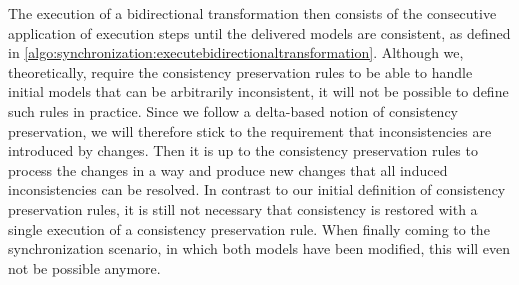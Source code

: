 The execution of a bidirectional transformation then consists of the consecutive application of execution steps until the delivered models are consistent, as defined in \autoref{algo:synchronization:executebidirectionaltransformation}.
Although we, theoretically, require the consistency preservation rules to be able to handle initial models that can be arbitrarily inconsistent, it will not be possible to define such rules in practice.
Since we follow a delta-based notion of consistency preservation, we will therefore stick to the requirement that inconsistencies are introduced by changes.
Then it is up to the consistency preservation rules to process the changes in a way and produce new changes that all induced inconsistencies can be resolved.
In contrast to our initial definition of consistency preservation rules, it is still not necessary that consistency is restored with a single execution of a consistency preservation rule.
When finally coming to the synchronization scenario, in which both models have been modified, this will even not be possible anymore.
